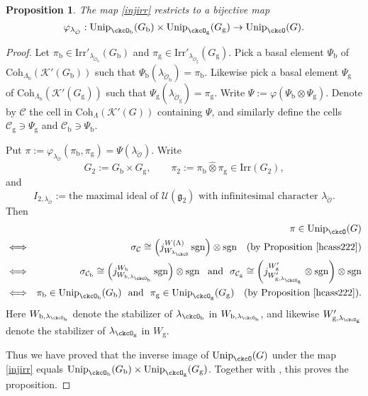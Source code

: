 \documentclass[12pt]{amsart}
\newcommand{\CC}{{\mathcal {C}}}
\newcommand{\CK}{{\mathcal {K}}}
\newcommand{\CO}{{\mathcal {O}}}
\newcommand{\CU}{{\mathcal {U}}}
\newcommand{\sgn}{\operatorname{sgn}}
\newcommand{\g}{\mathfrak g}
\numberwithin{equation}{section}
\newtheorem{prop}[thm]{Proposition}
\theoremstyle{remark}
\def\Irr{\mathrm{Irr}}
\def\Unip{\mathrm{Unip}}
\def\Coh{\mathrm{Coh}}
\begin{document}
\begin{prop}\label{propKL333}
The map  \eqref{injirr} restricts to a bijective map
\[
\varphi_{\lambda_{\check \CO}}:
\Unip_{\ckcO_{\mathrm b}}(G_{\mathrm b})\times \Unip_{\ckcO_{\mathrm g}}(G_{\mathrm g})
\rightarrow \Unip_{\ckcO}(G).
\]

\end{prop}
\begin{proof}
Let $\pi_\mathrm b\in  \Irr'_{\lambda_{\check \CO_\mathrm b}}(G_\mathrm b)$ and $\pi_\mathrm g\in  \Irr'_{\lambda_{\check \CO_\mathrm g}}(G_\mathrm g)$.  Pick a basal  element $\Psi_\mathrm b$ of  $\Coh_{ \Lambda_\mathrm b}(\CK'(G_\mathrm b))$ such that $\Psi_\mathrm b(\lambda_{\check \CO_\mathrm b})=\pi_\mathrm b$. Likewise pick a basal  element $\Psi_\mathrm g$ of $ \Coh_{ \Lambda_\mathrm b}(\CK'(G_\mathrm g))$ such that $\Psi_\mathrm g(\lambda_{\check \CO_\mathrm g})=\pi_\mathrm g$.
Write $\Psi:=\varphi(\Psi_\mathrm b\otimes \Psi_\mathrm g)$. Denote by $\CC$ the cell in $ \Coh_{\Lambda}(\CK'(G))$ containing $\Psi$, and similarly define the
 cells $\CC_\mathrm g\ni \Psi_{\mathrm g}$ and $\CC_\mathrm b\ni \Psi_{\mathrm b}$.

Put $\pi:= \varphi_{\lambda_{\check \CO}}(\pi_\mathrm b, \pi_\mathrm g)=\Psi(\lambda_{\check \CO})$. Write
\[
  G_2:=G_\mathrm b \times G_\mathrm g, \qquad \pi_2:=\pi_\mathrm b\widehat \otimes \pi_\mathrm g\in \Irr(G_2),
  \]
  and
  \[
   I_{2, \lambda_{\check \CO}}:=\textrm{the maximal ideal of $\CU(\g_2)$ with infinitesimal character $\lambda_{\check \CO}$.}
  \]
Then
 \begin{eqnarray*}
   && \pi\in  \Unip_{\ckcO}(G)\\
    &\Longleftrightarrow& \sigma_\CC\cong  \left( j_{W_{\lambda_\ckcO}}^{W(\Lambda)} \sgn\right)\otimes \sgn \quad (\textrm{by Proposition \ref{hcass222}})\\
   &\Longleftrightarrow& \sigma_{\CC_\mathrm b}\cong  \left( j_{W_{\mathrm b, \lambda_{\ckcO_\mathrm b}}}^{W_\mathrm b} \sgn\right)\otimes \sgn \ \ \textrm{and}\ \  \sigma_{\CC_\mathrm g}\cong  \left( j_{W'_{\mathrm g, \lambda_{\ckcO_\mathrm g}}}^{W'_\mathrm g} \otimes \sgn\right)\otimes \sgn\\
 &\Longleftrightarrow& \pi_\mathrm b\in  \Unip_{\ckcO_{\mathrm b}}(G_{\mathrm b}) \ \ \textrm{and}\ \  \pi_\mathrm g\in  \Unip_{\ckcO_{\mathrm g}}(G_{\mathrm g}) \quad (\textrm{by Proposition \ref{hcass222}}).
 \end{eqnarray*}
 Here $W_{\mathrm b, \lambda_{\ckcO_\mathrm b}}$ denote the stabilizer of $\lambda_{\ckcO_\mathrm b}$ in $W_{\mathrm b, \lambda_{\ckcO_\mathrm b}}$, and likewise $W'_{\mathrm g, \lambda_{\ckcO_\mathrm g}}$ denote the stabilizer of $\lambda_{\ckcO_\mathrm g}$ in $W_{\mathrm g}$.

 Thus we have proved that the inverse image of $\Unip_{\ckcO}(G)$ under the map \eqref{injirr} equals  $\Unip_{\ckcO_{\mathrm b}}(G_{\mathrm b})\times \Unip_{\ckcO_{\mathrm g}}(G_{\mathrm g})$. Together with ,  this proves the proposition. \end{proof}
\end{document}
